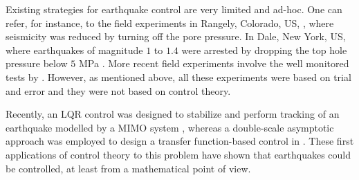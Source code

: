 \documentclass[journal,twoside,web]{ieeecolor}
\begin{document}


Existing strategies for earthquake control are very limited and ad-hoc. One can refer, for instance, to the field experiments in Rangely, Colorado, US, \cite{b:Raleigh1-Healy1-Bredehoeft}, where seismicity was reduced by turning off the pore pressure. In Dale, New York, US, where earthquakes of magnitude $1$ to $1.4$ were arrested by dropping the top hole pressure below $5$ MPa \cite{b:Fletcher-Sykes}. More recent field experiments involve the well monitored tests by \cite{b:Guglielmi-Cappa-Avouac-Henry-Elsworth,b:Cappa-Scuderi-Collettini-Guglielmi-Avouac}. However, as mentioned above, all these experiments were based on trial and error and they were not based on control theory.

Recently, an LQR control was designed to stabilize and perform tracking of an earthquake modelled by a MIMO system \cite{b:Stefanou2019}, whereas a double-scale asymptotic approach was employed to design a transfer function-based control in \cite{b:Stefanou2020}. These first applications of control theory to this problem have shown that earthquakes could be controlled, at least from a mathematical point of view.
\end{document}
